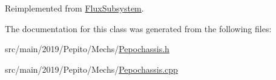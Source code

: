 Reimplemented from \hyperlink{classFluxSubsystem_a327d76affc60699bfa62563e364e42f5}{Flux\+Subsystem}.



The documentation for this class was generated from the following files\+:\begin{DoxyCompactItemize}
\item 
src/main/2019/\+Pepito/\+Mechs/\hyperlink{Pepochassis_8h}{Pepochassis.\+h}\item 
src/main/2019/\+Pepito/\+Mechs/\hyperlink{Pepochassis_8cpp}{Pepochassis.\+cpp}\end{DoxyCompactItemize}
